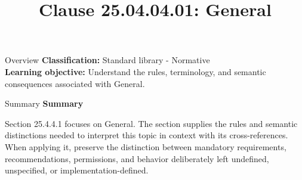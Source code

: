 \documentclass[10pt,letterpaper]{article}
\title{Clause 25.04.04.01: General}
\author{}
\date{}
\begin{document}
\maketitle
\begin{CornellOverviewBox}{Overview}
\textbf{Classification:} Standard library - Normative\\[2pt]
\textbf{Learning objective:} Understand the rules, terminology, and semantic consequences associated with General.
\end{CornellOverviewBox}\begin{CornellSummaryBox}{Summary}
{\sffamily\bfseries\color{Accent} Summary}\par\vspace{3pt}Section 25.4.4.1 focuses on General. The section supplies the rules and semantic distinctions needed to interpret this topic in context with its cross-references. When applying it, preserve the distinction between mandatory requirements, recommendations, permissions, and behavior deliberately left undefined, unspecified, or implementation-defined.
\end{CornellSummaryBox}
\end{document}

